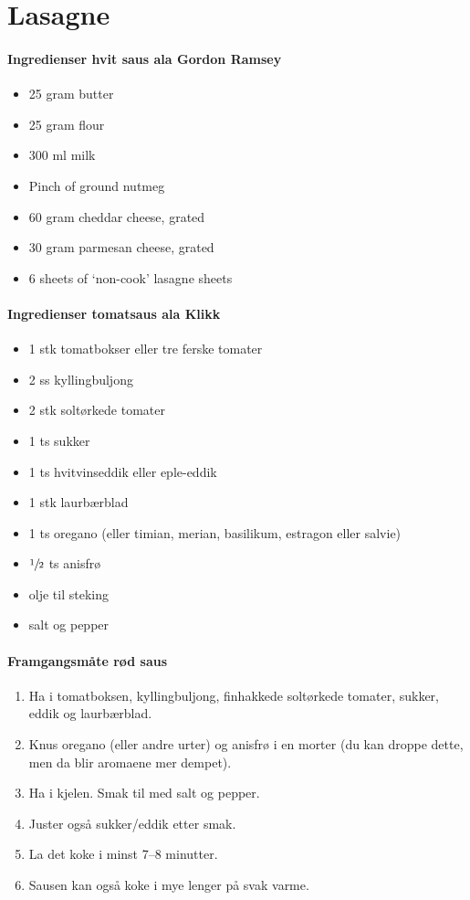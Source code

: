 \section{Lasagne}


\paragraph{Ingredienser hvit saus ala Gordon Ramsey}
\begin{itemize}[noitemsep]
  \item 25 gram butter
  \item 25 gram flour
  \item 300 ml milk
  \item Pinch of ground nutmeg
  \item 60 gram cheddar cheese, grated
  \item 30 gram parmesan cheese, grated
  \item 6 sheets of `non-cook' lasagne sheets
\end{itemize}

\paragraph{Ingredienser tomatsaus ala Klikk}
\begin{itemize}[noitemsep]
  \item 1 stk tomatbokser eller tre ferske tomater
  \item 2 ss kyllingbuljong
  \item 2 stk soltørkede tomater
  \item 1 ts sukker
  \item 1 ts hvitvinseddik eller eple-eddik
  \item 1 stk laurbærblad
  \item 1 ts oregano (eller timian, merian, basilikum, estragon eller salvie)
  \item  $\sfrac{1}{2}$  ts anisfrø
  \item olje til steking
  \item salt og pepper
\end{itemize}

\paragraph{Framgangsmåte rød saus}
\begin{enumerate}[noitemsep]
  \item Ha i tomatboksen, kyllingbuljong, finhakkede soltørkede tomater, sukker, eddik og laurbærblad.
  \item Knus oregano (eller andre urter) og anisfrø i en morter (du kan droppe dette, men da blir aromaene mer dempet).
  \item Ha i kjelen. Smak til med salt og pepper.
  \item Juster også sukker/eddik etter smak.
  \item La det koke i minst 7--8 minutter.
  \item Sausen kan også koke i mye lenger på svak varme.
  \end{enumerate}


